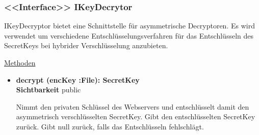 \subsubsection{<<Interface>> IKeyDecrytor} \label{service:klasse:IKeyDecryptor}
IKeyDecryptor bietet eine Schnittstelle für asymmetrische Decryptoren. Es wird verwendet um verschiedene Entschlüsselungsverfahren für das Entschlüsseln des SecretKeys bei hybrider Verschlüsselung anzubieten. \newline

\underline{Methoden}
\begin{itemize}
\itemsep0pt
\item \textbf{decrypt (encKey :File): SecretKey}\hfill\\
\textbf{Sichtbarkeit} public

Nimmt den privaten Schlüssel des Webservers und entschlüsselt damit den asymmetrisch verschlüsselten SecretKey. Gibt den entschlüsselten SecretKey zurück. Gibt null zurück, falls das Entschlüsseln fehlschlägt.

\end{itemize}